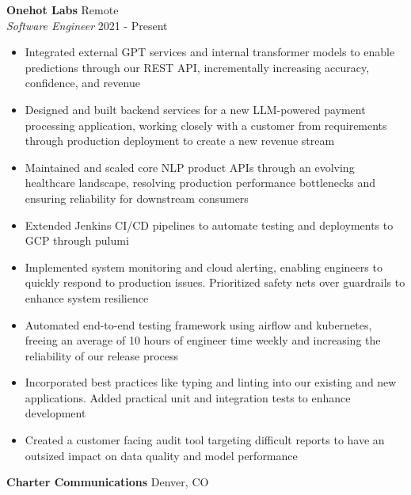 \documentclass[a4paper]{article}
\begin{document}
\textbf{Onehot Labs} \hfill Remote\\
\textit{Software Engineer} \hfill 2021 - Present\\
\vspace{-1mm}
\begin{itemize} \itemsep 1pt
  \item Integrated external GPT services and internal transformer models to enable predictions through our REST API, incrementally increasing accuracy, confidence, and revenue
  \item Designed and built backend services for a new LLM-powered payment processing application, working closely with a customer from requirements through production deployment to create a new revenue stream
  \item Maintained and scaled core NLP product APIs through an evolving healthcare landscape, resolving production performance bottlenecks and ensuring reliability for downstream consumers
  \item Extended Jenkins CI/CD pipelines to automate testing and deployments to GCP through pulumi
  \item Implemented system monitoring and cloud alerting, enabling engineers to quickly respond to production issues. Prioritized safety nets over guardrails to enhance system resilience
  \item Automated end-to-end testing framework using airflow and kubernetes, freeing an average of 10 hours of engineer time weekly and increasing the reliability of our release process
  \item Incorporated best practices like typing and linting into our existing and new applications. Added practical unit and integration tests to enhance development
  \item Created a customer facing audit tool targeting difficult reports to have an outsized impact on data quality and model performance

\end{itemize}

\textbf{Charter Communications} \hfill Denver, CO\\
\end{document}
